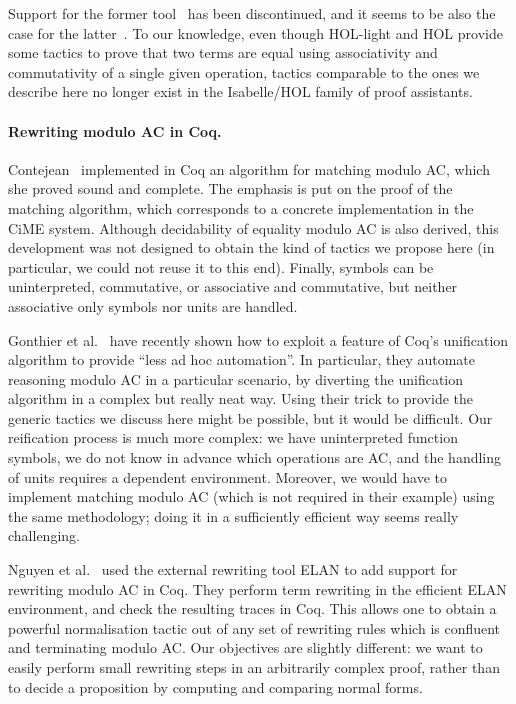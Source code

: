 \documentclass{llncs}
\begin{document}
Support for the former tool~\cite{nipkow-er} has been discontinued,
and it seems to be also the case for the latter~\cite{slind}. To our
knowledge, even though HOL-light and HOL provide some tactics to prove
that two terms are equal using associativity and commutativity of a
single given operation, tactics comparable to the ones we describe
here no longer exist in the Isabelle/HOL family of proof assistants.

\paragraph{Rewriting modulo AC in Coq.}

Contejean~\cite{contejean-04} implemented in Coq an algorithm for
matching modulo AC, which she proved sound and complete. The emphasis
is put on the proof of the matching algorithm, which corresponds to a
concrete implementation in the CiME system. Although decidability of
equality modulo AC is also derived, this development was not designed
to obtain the kind of tactics we propose here (in particular, we could
not reuse it to this end). Finally, symbols can be uninterpreted,
commutative, or associative and commutative, but neither associative
only symbols nor units are handled.

\smallskip

Gonthier et al.~\cite{gonthier:icfp11} have recently shown how to
exploit a feature of Coq's unification algorithm to provide ``less ad
hoc automation''. In particular, they automate reasoning modulo AC in
a particular scenario, by diverting the unification algorithm in a
complex but really neat way. Using their trick to provide the generic
tactics we discuss here might be possible, but it would be
difficult. Our reification process is much more complex: we have
uninterpreted function symbols, we do not know in advance which
operations are AC, and the handling of units requires a dependent
environment. Moreover, we would have to implement matching modulo AC
(which is not required in their example) using the same methodology;
doing it in a sufficiently efficient way seems really challenging.

\smallskip

Nguyen et al.~\cite{nguyen-kirchner-kirchner-02} used the external
rewriting tool ELAN to add support for rewriting modulo AC in
Coq. They perform term rewriting in the efficient ELAN environment,
and check the resulting traces in Coq. This allows one to obtain a
powerful normalisation tactic out of any set of rewriting rules which
is confluent and terminating modulo AC. Our objectives are slightly
different: we want to easily perform small rewriting steps in an
arbitrarily complex proof, rather than to decide a proposition by
computing and comparing normal forms.
\end{document}
